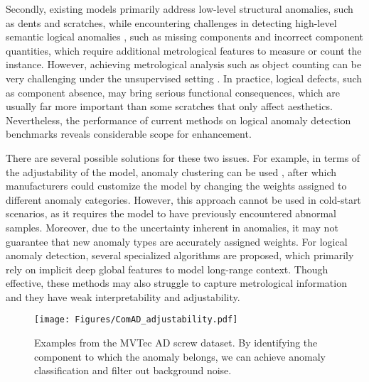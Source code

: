 \documentclass[final,5p,times,twocolumn]{elsarticle}
\begin{document}
Secondly, existing models primarily address low-level structural anomalies, such as dents and scratches, while encountering challenges in detecting high-level semantic logical anomalies \cite{bergmann2022beyond}, such as missing components and incorrect component quantities, which require additional metrological features to measure or count the instance. However, achieving metrological analysis such as object counting can be very challenging under the unsupervised setting \cite{radford2021learning}. In practice, logical defects, such as component absence, may bring serious functional consequences, which are usually far more important than some scratches that only affect aesthetics. Nevertheless, the performance of current methods on logical anomaly detection benchmarks \cite{bergmann2022beyond, ishida2023sa} reveals considerable scope for enhancement.

There are several possible solutions for these two issues. For example, in terms of the adjustability of the model, anomaly clustering can be used \cite{sohn2023anomaly}, after which manufacturers could customize the model by changing the weights assigned to different anomaly categories. However, this approach cannot be used in cold-start scenarios, as it requires the model to have previously encountered abnormal samples. Moreover, due to the uncertainty inherent in anomalies, it may not guarantee that new anomaly types are accurately assigned weights. For logical anomaly detection, several specialized algorithms \cite{bergmann2022beyond, tzachor2023set, batzner2023efficientad} are proposed, which primarily rely on implicit deep global features to model long-range context. Though effective, these methods may also struggle to capture metrological information \cite{batzner2023efficientad} and they have weak interpretability and adjustability.

\begin{figure}[]

    \centering
		\texttt{[image: Figures/ComAD\_adjustability.pdf]}
	\caption{Examples from the MVTec AD screw dataset. By identifying the component to which the anomaly belongs, we can achieve anomaly classification and filter out background noise.}
	\label{FIG:2}
\end{figure}
\end{document}
